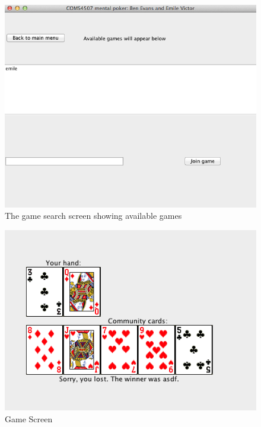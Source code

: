 \documentclass[11pt, oneside]{article}   	%
\begin{document}
\begin{figure}[h!]

\caption{The game search screen showing available games}
	\label{joinGame}
\centering
\includegraphics[bb=0 0 665 539,scale=0.55]{images/joinGame.png}
\end{figure}

\begin{figure}[h!]

\caption{Game Screen}
	\label{commCards}
\centering
\includegraphics[bb=0 0 485 348,scale=0.7]{images/commCards.png}
\end{figure}
\end{document}
